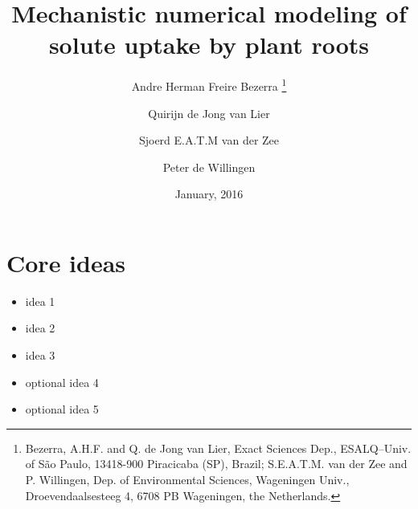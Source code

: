 \documentclass[10pt,a4paper,titlepage]{article}
\title{Mechanistic numerical modeling of solute uptake by plant roots}
\date{January, 2016}
\author{Andre Herman Freire Bezerra
  \thanks{
  Bezerra, A.H.F. and Q. de Jong van Lier, Exact Sciences Dep., ESALQ--Univ. of S\~ao Paulo, 13418-900 Piracicaba (SP), Brazil;
  S.E.A.T.M. van der Zee and P. Willingen, Dep. of Environmental Sciences, Wageningen Univ., Droevendaalsesteeg 4, 6708 PB Wageningen, the Netherlands.
  }
\and Quirijn de Jong van Lier \and Sjoerd E.A.T.M van der Zee \and Peter de Willingen}
\begin{document}
\linenumbers
\maketitle

\section*{Core ideas}
\begin{itemize}
  \item idea 1
  \item idea 2
  \item idea 3
  \item optional idea 4
  \item optional idea 5
\end{itemize}








 
\pagebreak

\end{document}
